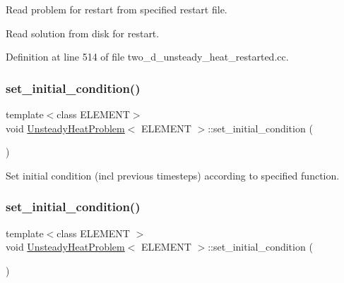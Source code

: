 Read problem for restart from specified restart file. 

Read solution from disk for restart. 

Definition at line 514 of file two\+\_\+d\+\_\+unsteady\+\_\+heat\+\_\+restarted.\+cc.

\mbox{\label{classUnsteadyHeatProblem_a98de3ed2d9cf5409323121bbb482bc1b}} 
\subsubsection{\texorpdfstring{set\+\_\+initial\+\_\+condition()}{set\_initial\_condition()}\hspace{0.1cm}{\footnotesize\ttfamily [1/2]}}
{\footnotesize\ttfamily template$<$class E\+L\+E\+M\+E\+NT$>$ \\
void \hyperlink{classUnsteadyHeatProblem}{Unsteady\+Heat\+Problem}$<$ E\+L\+E\+M\+E\+NT $>$\+::set\+\_\+initial\+\_\+condition (\begin{DoxyParamCaption}{ }\end{DoxyParamCaption})}



Set initial condition (incl previous timesteps) according to specified function. 

\mbox{\label{classUnsteadyHeatProblem_a98de3ed2d9cf5409323121bbb482bc1b}} 
\subsubsection{\texorpdfstring{set\+\_\+initial\+\_\+condition()}{set\_initial\_condition()}\hspace{0.1cm}{\footnotesize\ttfamily [2/2]}}
{\footnotesize\ttfamily template$<$class E\+L\+E\+M\+E\+NT $>$ \\
void \hyperlink{classUnsteadyHeatProblem}{Unsteady\+Heat\+Problem}$<$ E\+L\+E\+M\+E\+NT $>$\+::set\+\_\+initial\+\_\+condition (\begin{DoxyParamCaption}{ }\end{DoxyParamCaption})}



